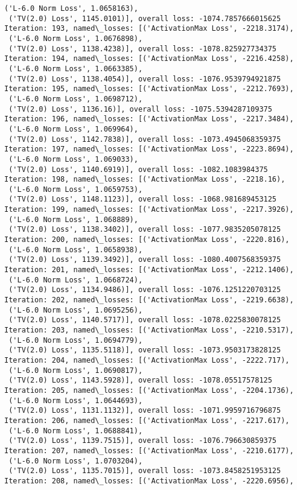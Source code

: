 \documentclass[10pt]{article}
\begin{document}
\begin{Verbatim}[commandchars=\\\{\}]
 ('L-6.0 Norm Loss', 1.0658163),
 ('TV(2.0) Loss', 1145.0101)], overall loss: -1074.7857666015625
Iteration: 193, named\_losses: [('ActivationMax Loss', -2218.3174),
 ('L-6.0 Norm Loss', 1.0676898),
 ('TV(2.0) Loss', 1138.4238)], overall loss: -1078.825927734375
Iteration: 194, named\_losses: [('ActivationMax Loss', -2216.4258),
 ('L-6.0 Norm Loss', 1.0663385),
 ('TV(2.0) Loss', 1138.4054)], overall loss: -1076.9539794921875
Iteration: 195, named\_losses: [('ActivationMax Loss', -2212.7693),
 ('L-6.0 Norm Loss', 1.0698712),
 ('TV(2.0) Loss', 1136.16)], overall loss: -1075.5394287109375
Iteration: 196, named\_losses: [('ActivationMax Loss', -2217.3484),
 ('L-6.0 Norm Loss', 1.069964),
 ('TV(2.0) Loss', 1142.7838)], overall loss: -1073.4945068359375
Iteration: 197, named\_losses: [('ActivationMax Loss', -2223.8694),
 ('L-6.0 Norm Loss', 1.069033),
 ('TV(2.0) Loss', 1140.6919)], overall loss: -1082.1083984375
Iteration: 198, named\_losses: [('ActivationMax Loss', -2218.16),
 ('L-6.0 Norm Loss', 1.0659753),
 ('TV(2.0) Loss', 1148.1123)], overall loss: -1068.981689453125
Iteration: 199, named\_losses: [('ActivationMax Loss', -2217.3926),
 ('L-6.0 Norm Loss', 1.068889),
 ('TV(2.0) Loss', 1138.3402)], overall loss: -1077.9835205078125
Iteration: 200, named\_losses: [('ActivationMax Loss', -2220.816),
 ('L-6.0 Norm Loss', 1.0658938),
 ('TV(2.0) Loss', 1139.3492)], overall loss: -1080.4007568359375
Iteration: 201, named\_losses: [('ActivationMax Loss', -2212.1406),
 ('L-6.0 Norm Loss', 1.0668724),
 ('TV(2.0) Loss', 1134.9486)], overall loss: -1076.1251220703125
Iteration: 202, named\_losses: [('ActivationMax Loss', -2219.6638),
 ('L-6.0 Norm Loss', 1.0695256),
 ('TV(2.0) Loss', 1140.5717)], overall loss: -1078.0225830078125
Iteration: 203, named\_losses: [('ActivationMax Loss', -2210.5317),
 ('L-6.0 Norm Loss', 1.0694779),
 ('TV(2.0) Loss', 1135.5118)], overall loss: -1073.9503173828125
Iteration: 204, named\_losses: [('ActivationMax Loss', -2222.717),
 ('L-6.0 Norm Loss', 1.0690817),
 ('TV(2.0) Loss', 1143.5928)], overall loss: -1078.05517578125
Iteration: 205, named\_losses: [('ActivationMax Loss', -2204.1736),
 ('L-6.0 Norm Loss', 1.0644693),
 ('TV(2.0) Loss', 1131.1132)], overall loss: -1071.9959716796875
Iteration: 206, named\_losses: [('ActivationMax Loss', -2217.617),
 ('L-6.0 Norm Loss', 1.0688841),
 ('TV(2.0) Loss', 1139.7515)], overall loss: -1076.796630859375
Iteration: 207, named\_losses: [('ActivationMax Loss', -2210.6177),
 ('L-6.0 Norm Loss', 1.0703204),
 ('TV(2.0) Loss', 1135.7015)], overall loss: -1073.8458251953125
Iteration: 208, named\_losses: [('ActivationMax Loss', -2220.6956),

\end{Verbatim}
\end{document}
